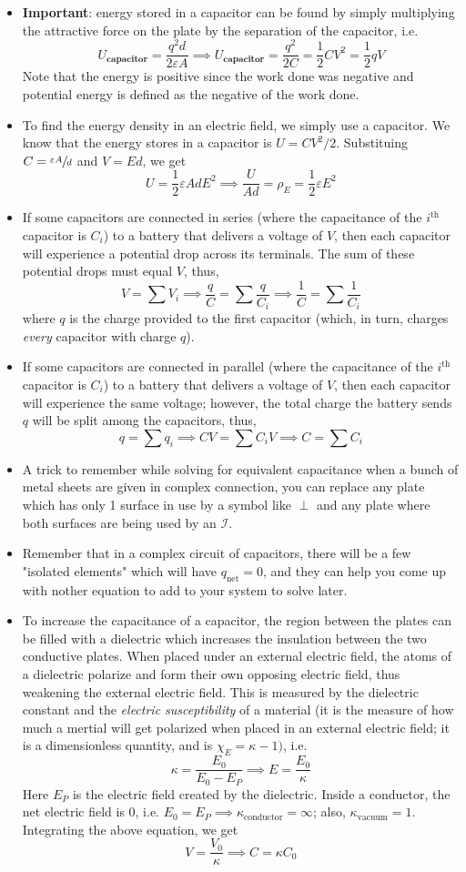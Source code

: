 \documentclass{scrartcl}
\begin{document}
\begin{itemize}
        \item \textbf{Important}: energy stored in a capacitor can be found by simply multiplying the attractive force on the plate by the separation of the capacitor, i.e. \[U_\textbf{capacitor}=\frac{q^2d}{2\varepsilon A}\implies\boxed{U_\textbf{capacitor}=\frac{q^2}{2C}=\frac12CV^2=\frac12qV}\] Note that the energy is positive since the work done was negative and potential energy is defined as the negative of the work done.
        \item To find the energy density in an electric field, we simply use a capacitor. We know that the energy stores in a capacitor is $U=CV^2/2$. Substituing $C=\sfrac{\varepsilon A}d$ and $V=Ed$, we get \[U=\frac12\varepsilon AdE^2\implies\frac U{Ad}=\rho_E=\frac12\varepsilon E^2\]
        \item If some capacitors are connected in series (where the capacitance of the $i^\text{th}$ capacitor is $C_i$) to a battery that delivers a voltage of $V$, then each capacitor will experience a potential drop across its terminals. The sum of these potential drops must equal $V$, thus, \[V=\sum V_i\implies\frac qC=\sum\frac q{C_i}\implies\boxed{\frac1C=\sum\frac1{C_i}}\] where $q$ is the charge provided to the first capacitor (which, in turn, charges \textit{every} capacitor with charge $q$).
        \item If some capacitors are connected in parallel (where the capacitance of the $i^\text{th}$ capacitor is $C_i$) to a battery that delivers a voltage of $V$, then each capacitor will experience the same voltage; however, the total charge the battery sends $q$ will be split among the capacitors, thus, \[q=\sum q_i\implies CV=\sum C_iV\implies\boxed{C=\sum C_i}\]
        \item A trick to remember while solving for equivalent capacitance when a bunch of metal sheets are given in complex connection, you can replace any plate which has only 1 surface in use by a symbol like $\perp$ and any plate where both surfaces are being used by an $\mathcal I$.
        \item Remember that in a complex circuit of capacitors, there will be a few "isolated elements" which will have $q_\text{net}=0$, and they can help you come up with nother equation to add to your system to solve later.
        \item To increase the capacitance of a capacitor, the region between the plates can be filled with a dielectric which increases the insulation between the two conductive plates. When placed under an external electric field, the atoms of a dielectric polarize and form their own opposing electric field, thus weakening the external electric field. This is measured by the dielectric constant and the \textit{electric susceptibility} of a material (it is the measure of how much a mertial will get polarized when placed in an external electric field; it is a dimensionless quantity, and is $\chi_E=\kappa-1)$, i.e. \[\kappa=\frac{E_0}{E_0-E_P}\implies E=\frac{E_0}\kappa\] Here $E_P$ is the electric field created by the dielectric. Inside a conductor, the net electric field is 0, i.e. $E_0=E_P\implies\kappa_\text{conductor}=\infty$; also, $\kappa_\text{vacuum}=1$. Integrating the above equation, we get \[V=\frac{V_0}{\kappa}\implies C=\kappa C_0\]

\end{itemize}
\end{document}
